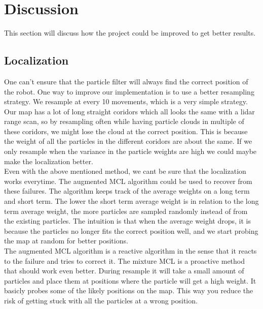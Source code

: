 
\section{Discussion} %
\label{sec:discussion}

This section will discuss how the project could be improved to get better results.

\subsection{Localization}
One can't ensure that the particle filter will always find the correct position of the robot.
One way to improve our implementation is to use a better resampling strategy.
We resample at every 10 movements, which is a very simple strategy.
Our map has a lot of long straight coridors which all looks the same with a lidar range scan, so by resampling often while having particle clouds in multiple of these coridors, we might lose the cloud at the correct position.
This is because the weight of all the particles in the different coridors are about the same.
If we only resample when the variance in the particle weights are high we could maybe make the localization better. \\

Even with the above mentioned method, we cant be sure that the localization works everytime.
The augmented MCL algorithm could be used to recover from these failures.
The algorithm keeps track of the average weights on a long term and short term.
The lower the short term average weight is in relation to the long term average weight, the more particles are sampled randomly instead of from the existing particles.
The intuition is that when the average weight drops, it is because the particles no longer fits the correct position well, and we start probing the map at random for better positions. \\

The augmented MCL algorithm is a reactive algorithm in the sense that it reacts to the failure and tries to correct it.
The mixture MCL is a proactive method that should work even better.
During resample it will take a small amount of particles and place them at positions where the particle will get a high weight.
It basicly probes some of the likely positions on the map.
This way you reduce the risk of getting stuck with all the particles at a wrong position.

